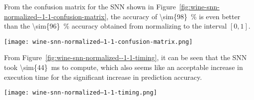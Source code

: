 \documentclass[
  coursecode={CMPE 251},
  assignmentname={Exercise \exercisenumber},
  studentnumber=20053722,
  name={Bryan Hoang},
  final,
]{
  ltxanswer%
}
\begin{document}
\begin{questions}
\begin{solution}
      From the confusion matrix for the SNN shown in Figure~\ref{fig:wine-snn-normalized--1-1-confusion-matrix}, the accuracy of \qty{\sim{98}}{\percent} is even better than the \qty{\sim{96}}{\percent} accuracy obtained from normalizing to the interval \([0,1]\).

      \begin{answerfigure}
        \texttt{[image: wine-snn-normalized--1-1-confusion-matrix.png]}
        \label{fig:wine-snn-normalized--1-1-confusion-matrix}
      \end{answerfigure}

      From Figure~\ref{fig:wine-snn-normalized--1-1-timing}, it can be seen that the SNN took \qty{\sim{44}}{\ms} to compute, which also seems like an acceptable increase in execution time for the significant increase in prediction accuracy.

      \begin{answerfigure}
        \texttt{[image: wine-snn-normalized--1-1-timing.png]}
        \label{fig:wine-snn-normalized--1-1-timing}
      \end{answerfigure}
    \end{solution}
  \end{questions}
\end{document}

